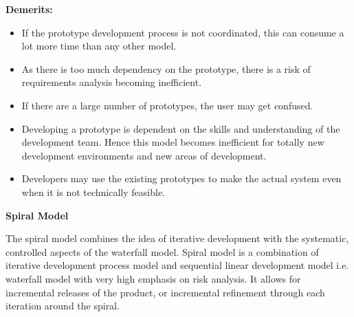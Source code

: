 \documentclass{article}
\begin{document}
\textbf{Demerits:}
\begin{itemize}
    
\item If the prototype development process is not coordinated, this can consume a lot more time than any other model.
\item 	As there is too much dependency on the prototype, there is a risk of requirements analysis becoming inefficient.
\item 	If there are a large number of prototypes, the user may get confused.
\item 	Developing a prototype is dependent on the skills and understanding of the development team. Hence this model becomes inefficient for totally new development environments and new areas of development.
\item 	Developers may use the existing prototypes to make the actual system even when it is not technically feasible. 
 
\end{itemize}
\vspace{0.5cm}
\large{\textbf{Spiral Model }}

The spiral model combines the idea of iterative development with the systematic, controlled aspects of the waterfall model. Spiral model is a combination of iterative development process model and sequential linear development model i.e. waterfall model with very high emphasis on risk analysis. It allows for incremental releases of the product, or incremental refinement through each iteration around the spiral.\\
\end{document}
